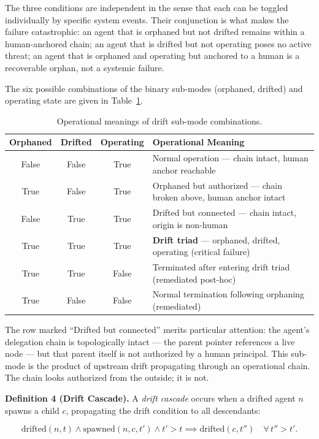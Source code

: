 The three conditions are independent in the sense that each can be toggled individually by specific system events. Their conjunction is what makes the failure catastrophic: an agent that is orphaned but not drifted remains within a human-anchored chain; an agent that is drifted but not operating poses no active threat; an agent that is orphaned and operating but anchored to a human is a recoverable orphan, not a systemic failure.

The six possible combinations of the binary sub-modes (orphaned, drifted) and operating state are given in Table~\ref{tab:rs-drift-submodes}.

\begin{table}[h]
\centering
\begin{tabular}{c|c|c|p{4.8cm}}
\textbf{Orphaned} & \textbf{Drifted} & \textbf{Operating} & \textbf{Operational Meaning} \\ \hline
False & False & True  & Normal operation — chain intact, human anchor reachable \\
True  & False & True  & Orphaned but authorized — chain broken above, human anchor intact \\
False & True  & True  & Drifted but connected — chain intact, origin is non-human \\
True  & True  & True  & \textbf{Drift triad} — orphaned, drifted, operating (critical failure) \\
True  & True  & False & Terminated after entering drift triad (remediated post-hoc) \\
True  & False & False & Normal termination following orphaning (remediated)
\end{tabular}
\caption{Operational meanings of drift sub-mode combinations.}
\label{tab:rs-drift-submodes}
\end{table}

The row marked ``Drifted but connected'' merits particular attention: the agent's delegation chain is topologically intact — the parent pointer references a live node — but that parent itself is not authorized by a human principal. This sub-mode is the product of upstream drift propagating through an operational chain. The chain looks authorized from the outside; it is not.

\medskip
\noindent\textbf{Definition 4 (Drift Cascade).}
A \emph{drift cascade} occurs when a drifted agent $n$ spawns a child $c$, propagating the drift condition to all descendants:

\begin{equation}
\mathrm{drifted}(n, t) \land \mathrm{spawned}(n, c, t') \land t' > t \implies \mathrm{drifted}(c, t'')\quad \forall\, t'' > t'.
\label{eq:rs-drift-cascade}
\end{equation}

